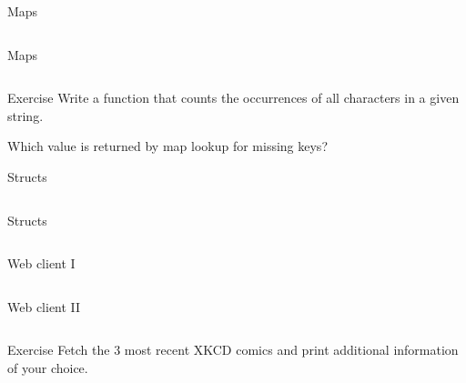 \documentclass[10pt]{beamer}
\begin{document}
	
	\begin{frame}[fragile]{Maps}
		\inputminted{go}{code/07_maps.go}
	\end{frame}
			
	
	\begin{frame}[fragile]{Maps}
		\inputminted{go}{code/07b_maps.go}
	\end{frame}
	
	
	\begin{frame}[fragile]{Exercise}
		Write a function that counts the occurrences of all characters in a given string.
	
		Which value is returned by map lookup for missing keys?
	\end{frame}
	
	
	\begin{frame}[fragile]{Structs}
		\inputminted{go}{code/08_structs.go}
	\end{frame}
		
	
	\begin{frame}[fragile]{Structs}
		\inputminted{go}{code/09_structs.go}
	\end{frame}
			
	
	\begin{frame}[fragile]{Web client I}
		\inputminted[fontsize=\footnotesize]{go}{code/10_xkcd.go}
	\end{frame}
				
	
	\begin{frame}[fragile]{Web client II}
		\inputminted{go}{code/10b_xkcd.go}
	\end{frame}
	
	
	\begin{frame}[fragile]{Exercise}
		Fetch the 3 most recent XKCD comics and print additional information of your choice.
	\end{frame}
					
\end{document}

